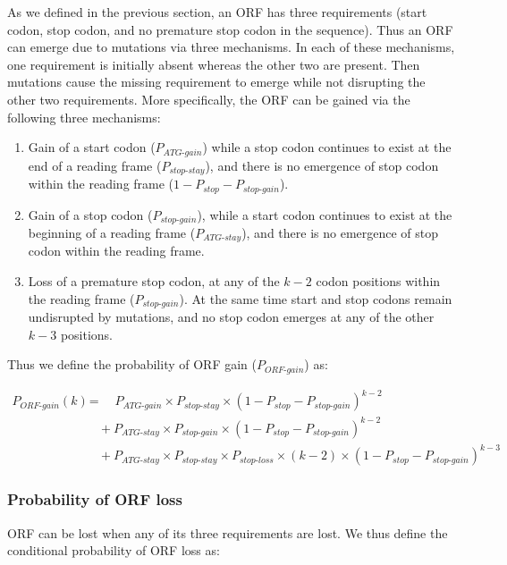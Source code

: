 \documentclass[12pt,a4paper]{article}
\begin{document}
As we defined in the previous section, an ORF has three requirements (start codon, stop codon, and no premature stop codon in the sequence). Thus an ORF can emerge due to mutations via three mechanisms. In each of these mechanisms, one requirement is initially absent whereas the other two are present. Then mutations cause the missing requirement to emerge while not disrupting the other two requirements. More specifically, the ORF can be gained via the following three mechanisms:
\begin{enumerate}
\item Gain of a start codon ($P_\textit{ATG-gain}$) while a stop codon continues to exist at the end of a reading frame ($P_\textit{stop-stay}$), and there is no emergence of stop codon within the reading frame ($1- P_\textit{stop} - P_\textit{stop-gain}$).
\item Gain of a stop codon ($P_\textit{stop-gain}$), while a start codon continues to exist at the beginning of a reading frame ($P_\textit{ATG-stay}$), and there is no emergence of stop codon within the reading frame.
\item Loss of a premature stop codon, at any of the $k-2$ codon positions within the reading frame ($P_\textit{stop-gain}$). At the same time start and stop codons remain undisrupted by mutations, and no stop codon emerges at any of the other $k-3$ positions.
\end{enumerate} 

Thus we define the probability of ORF gain ($P_\textit{ORF-gain}$) as:

\begin{align}
P_\textit{ORF-gain}(k) & = \quad P_\textit{ATG-gain}\times P_\textit{stop-stay} \times (1- P_\textit{stop} - P_\textit{stop-gain})^{k-2} \nonumber \\[1pt]
& \quad + P_\textit{ATG-stay}\times P_\textit{stop-gain} \times (1- P_\textit{stop} - P_\textit{stop-gain})^{k-2} \nonumber \\[1pt]
& \quad + P_\textit{ATG-stay}\times P_\textit{stop-stay} \times P_\textit{stop-loss}\times(k-2) \times (1- P_\textit{stop} - P_\textit{stop-gain})^{k-3} 
\label{eqorfgain}
\end{align}

\subsubsection{Probability of ORF loss}

ORF can be lost when any of its three requirements are lost. We thus define the conditional probability of ORF loss as:
\end{document}
